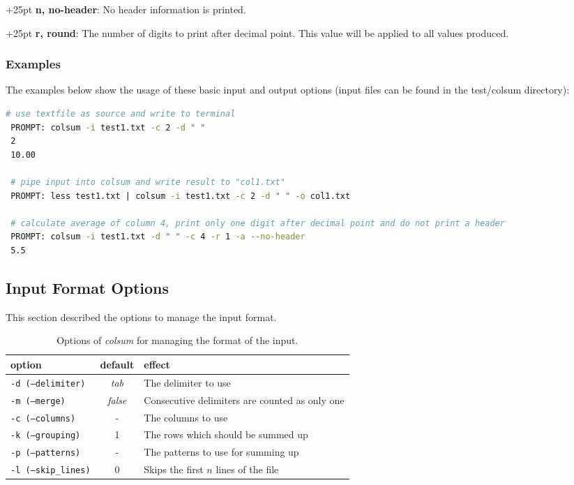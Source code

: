 \documentclass[a4paper,10pt,parskip=half]{scrreprt}
\begin{document}
\hangindent+25pt 
\textbf{n, no-header}: No header information is printed.

\hangindent+25pt 
\textbf{r, round}: The number of digits to print after decimal point. This value will be applied to all values produced.


\subsubsection*{Examples}
The examples below show the usage of these basic input and output options (input files can be found in the test/colsum directory):
 \lstset{language=bash}
\begin{lstlisting}[language=bash,frame=none,morekeywords={PROMPT}]
 # use textfile as source and write to terminal
 PROMPT: colsum -i test1.txt -c 2 -d " "
 2
 10.00
 
 # pipe input into colsum and write result to "col1.txt"
 PROMPT: less test1.txt | colsum -i test1.txt -c 2 -d " " -o col1.txt
 
 # calculate average of column 4, print only one digit after decimal point and do not print a header
 PROMPT: colsum -i test1.txt -d " " -c 4 -r 1 -a --no-header
 5.5
 \end{lstlisting}
 
 
\subsection{Input Format Options}

This section described the options to manage the input format. 
 \begin{table}[h]
 \caption{Options of \textit{colsum} for managing the format of the input.}
 \begin{tabular}{lcp{7cm}}\hline
 option& default & effect \\\hline
 \texttt{-d (--delimiter)}& \textit{tab} & The delimiter to use\\
 \texttt{-m (--merge)} &\textit{false}& Consecutive delimiters are counted as only one\\
 \texttt{-c (--columns)} &-& The columns to use\\
 \texttt{-k (--grouping)} & 1 & The rows which should be summed up\\
 \texttt{-p (--patterns)} & - & The patterns to use for summing up\\
 \texttt{-l (--skip\_lines)} &0 & Skips the first $n$ lines of the file\\
\end{tabular}
\end{table}
\end{document}
